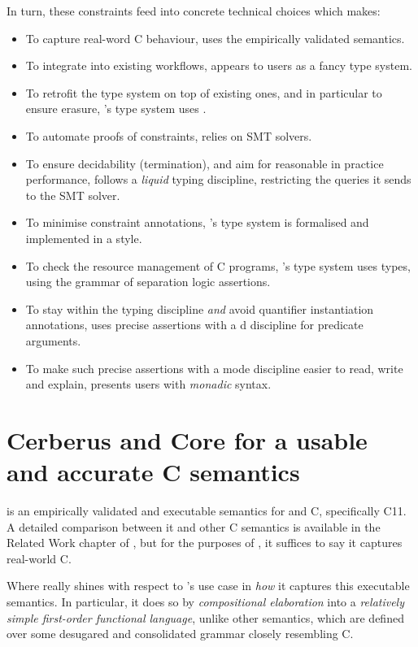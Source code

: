 In turn, these constraints feed into concrete technical choices which 
makes:
\begin{itemize}
    \item To capture real-word C behaviour,  uses the 
        empirically validated semantics.
    \item To integrate into existing workflows,  appears to users
        as a fancy type system.
    \item To retrofit the type system on top of existing ones, and in
	particular to ensure erasure, 's type system uses
	.
    \item To automate proofs of constraints,  relies on SMT solvers.
    \item To ensure decidability (termination), and aim for reasonable in
        practice performance,  follows a \emph{liquid} typing
	discipline, restricting the queries it sends to the SMT solver.
    \item To minimise constraint annotations, 's type system is
        formalised and implemented in a  style.
    \item To check the resource management of C programs, 's type
        system uses  types, using the grammar of separation
        logic assertions.
    \item To stay within the  typing discipline \emph{and} avoid
	quantifier instantiation annotations,  uses precise assertions
	with a d discipline for predicate arguments.
    \item To make such precise assertions with a mode discipline easier to read,
	write and explain,  presents users with \emph{monadic} syntax.
\end{itemize}

\section{Cerberus and Core for a usable and accurate C semantics}%
\label{sec:cerberus-core}

 is an empirically validated and executable semantics for
 and  C, specifically C11. A detailed comparison
between it and other C semantics is available in the Related Work chapter
of , but for the purposes of ,
it suffices to say it captures real-world C.

Where  really shines with respect to 's use case in
\emph{how} it captures this executable semantics. In particular, it does so by
\emph{compositional elaboration} into a \emph{relatively simple first-order
functional language}, unlike other semantics, which are defined over some
desugared and consolidated grammar closely resembling C.

